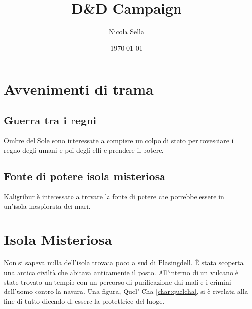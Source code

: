 \documentclass[10pt,twoside,twocolumn]{article}
\title{D\&D Campaign}
\author{Nicola Sella}
\date{\today}
\begin{document}
\maketitle

\tableofcontents

\selectfont %
\section{Avvenimenti di trama}
\subsection{Guerra tra i regni}
Ombre del Sole sono interessate a compiere un colpo di stato per rovesciare il regno degli umani e
poi degli elfi e prendere il potere. 

\subsection{Fonte di potere isola misteriosa}
Kaligribur \`e interessato a trovare la fonte di potere che potrebbe essere in un'isola
inesplorata dei mari.
\section{Isola Misteriosa}
Non si sapeva nulla dell'isola trovata poco a sud di Blasingdell.
\`E stata scoperta una antica civilt\`a che abitava anticamente il posto.
All'interno di un vulcano \`e stato trovato un tempio con un percorso di
purificazione dai mali e i crimini dell'uomo contro la natura. Una figura, Quel' Cha \ref{char:quelcha}, si \`e
rivelata alla fine di tutto dicendo di essere la protettrice del luogo.
\end{document}
